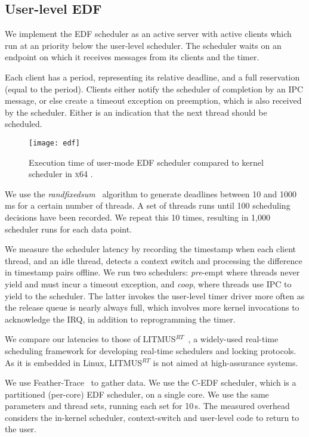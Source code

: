 \subsection{User-level EDF}\label{s:edf-impl}

We implement the EDF scheduler as an active server with active
clients which run at an \selfour priority below the user-level scheduler.
The scheduler waits on an endpoint on which it receives messages from
its clients and the timer.

Each client has a period, representing its relative deadline, and a full reservation (equal to the period). Clients
either notify the scheduler of completion by an IPC
message, or else create a timeout exception on preemption, which is also received by the
scheduler. Either is an indication that the next thread should be scheduled.

\begin{figure}[t]
\centering
\texttt{[image: edf]}
\caption[Results of \selfour user-level EDF versus \litmus.]{Execution time of \selfour user-mode EDF scheduler compared to
         kernel scheduler in \textsc{x64} \litmus.}
\label{f:edf}
\end{figure}


We use the \emph{randfixedsum}~\citep{Emberson_SD_10} algorithm to
generate deadlines between 10 and 1000\,ms for a certain number of threads.
A set of threads runs until 100
scheduling decisions have been recorded. We repeat this 10 times,
resulting in 1,000 scheduler runs for each data point.

We measure the scheduler latency by recording the timestamp when each client thread, and an idle
thread, detects a
context switch and processing the difference in timestamp pairs offline. We run two schedulers:
\emph{pre}-empt where threads never yield and must incur a timeout exception, and \emph{coop}, where
threads use IPC to yield to the scheduler. The latter invokes the user-level timer
driver more often as the release queue is nearly always full, which involves more kernel invocations
to acknowledge the IRQ, in addition to reprogramming the timer.

We compare our latencies to those of
LITMUS$^{RT}$~\citep{Calandrino_LBDA_06}, a widely-used real-time scheduling
framework for developing real-time schedulers and locking protocols. 
As it is  embedded in Linux, LITMUS$^{RT}$ is not aimed at high-assurance systems.

We use Feather-Trace~\citep{Brandenburg_Anderson_07} to gather data.
We use the C-EDF scheduler, which is a partitioned (per-core) EDF scheduler, on a single
core. We use the same parameters and thread sets, running each set for 10\,s. 
The measured overhead considers the in-kernel scheduler, context-switch and user-level code to return to
the user.


